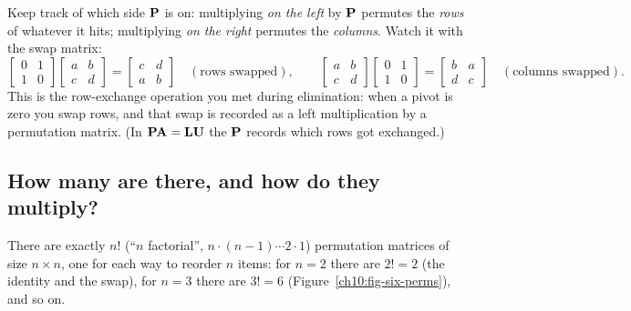Keep track of which side $\mathbf{P}$ is on: multiplying \emph{on the left} by $\mathbf{P}$ permutes the \emph{rows} of
whatever it hits; multiplying \emph{on the right} permutes the \emph{columns}. Watch it with the swap
matrix:
\[
  \begin{bmatrix}0&1\\1&0\end{bmatrix}
  \begin{bmatrix}a&b\\c&d\end{bmatrix}
  = \begin{bmatrix}c&d\\a&b\end{bmatrix}
  \quad(\text{rows swapped}),
  \qquad
  \begin{bmatrix}a&b\\c&d\end{bmatrix}
  \begin{bmatrix}0&1\\1&0\end{bmatrix}
  = \begin{bmatrix}b&a\\d&c\end{bmatrix}
  \quad(\text{columns swapped}).
\]
This is the row-exchange operation you met during elimination: when a pivot is zero you swap
rows, and that swap is recorded as a left multiplication by a permutation matrix. (In $\mathbf{P}\mathbf{A}=\mathbf{L}\mathbf{U}$
the $\mathbf{P}$ records which rows got exchanged.)

\subsection{How many are there, and how do they multiply?}

There are exactly $n!$ (``$n$ factorial'', $n\cdot(n-1)\cdots 2\cdot 1$) permutation matrices of
size $n\times n$, one for each way to reorder $n$ items: for $n=2$ there are $2!=2$ (the identity
and the swap), for $n=3$ there are $3!=6$ (Figure~\ref{ch10:fig-six-perms}), and so on.

